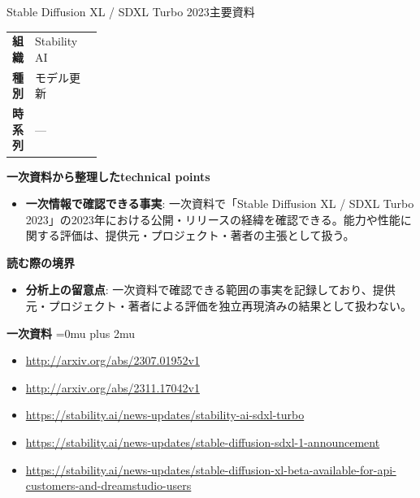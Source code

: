 \begin{technicalnote}{Stable Diffusion XL / SDXL Turbo 2023}{主要資料}
\begingroup
\begin{tabularx}{\linewidth}{@{}>{\bfseries}p{0.22\linewidth}X@{}}
組織 & Stability AI \\
種別 & モデル更新 \\
時系列 & — \\
\end{tabularx}
\smallskip
{\bfseries 一次資料から整理したtechnical points}
\begin{itemize}[leftmargin=1.5em,itemsep=0.35em]
\item \textbf{一次情報で確認できる事実}: 一次資料で「Stable Diffusion XL / SDXL Turbo 2023」の2023年における公開・リリースの経緯を確認できる。能力や性能に関する評価は、提供元・プロジェクト・著者の主張として扱う。
\end{itemize}
\begin{minipage}{\linewidth}
{\bfseries 読む際の境界}
\begin{itemize}[leftmargin=1.5em,itemsep=0.35em]
\item \textbf{分析上の留意点}: 一次資料で確認できる範囲の事実を記録しており、提供元・プロジェクト・著者による評価を独立再現済みの結果として扱わない。
\end{itemize}
\begin{samepage}
{\bfseries 一次資料}
\begingroup\sloppy
\Urlmuskip=0mu plus 2mu\relax
\begin{itemize}[leftmargin=1.5em,itemsep=0.25em]
\item {\scriptsize\url{http://arxiv.org/abs/2307.01952v1}}
\item {\scriptsize\url{http://arxiv.org/abs/2311.17042v1}}
\item {\scriptsize\url{https://stability.ai/news-updates/stability-ai-sdxl-turbo}}
\item {\scriptsize\url{https://stability.ai/news-updates/stable-diffusion-sdxl-1-announcement}}
\item {\scriptsize\url{https://stability.ai/news-updates/stable-diffusion-xl-beta-available-for-api-customers-and-dreamstudio-users}}
\end{itemize}
\endgroup
\end{samepage}
\end{minipage}
\endgroup
\end{technicalnote}
\medskip

